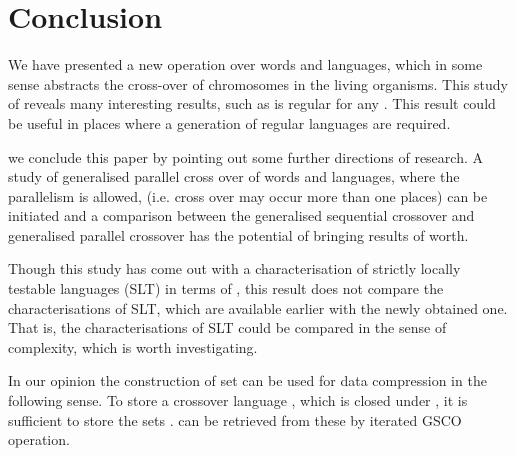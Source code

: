 \documentclass{llncs}
\begin{document}
\section{Conclusion}
We have presented a new operation  over words and languages,
which in some sense abstracts the cross-over of chromosomes in the
living organisms. This study of  reveals many interesting
results, such as   is regular for any . This result
could be useful in places where a generation of regular languages
are required. \par we conclude this paper by pointing out some further directions of research.
A study of generalised parallel cross over of words and languages, where the
parallelism is allowed, (i.e. cross over may occur more than one places) can be
initiated and a comparison between the generalised sequential crossover and
generalised parallel crossover has the potential of bringing results of worth.
\par Though this study has come out with a characterisation of strictly locally
testable languages (SLT) in terms of , this result does not
compare the characterisations of SLT, which are available earlier
with the newly obtained one. That is, the characterisations of SLT
could be compared in the sense of complexity, which is worth
investigating.
\par In our opinion the construction of  set can  be used for data compression
in the following sense. To store a
 crossover language , which is closed under , it is sufficient to store the
sets  .  can be retrieved from these by iterated GSCO
operation.
 
\end{document}
